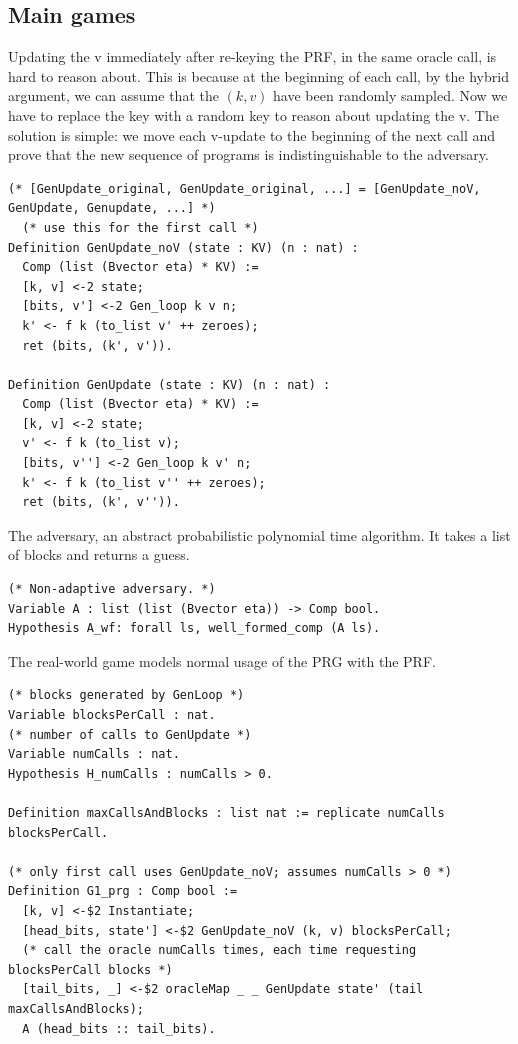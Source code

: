 \documentclass[12pt,lot, lof]{puthesis}
\begin{document}
{\subsection{Main games} \label{sec:main_games}

Updating the v immediately after re-keying the PRF, in the same oracle call, is hard to reason about. This is because at the beginning of each call, by the hybrid argument, we can assume that the $(k,v)$ have been randomly sampled. Now we have to replace the key with a random key to reason about updating the v. The solution is simple: we move each v-update to the beginning of the next call and prove that the new sequence of programs is indistinguishable to the adversary. 

\begin{lstlisting}
(* [GenUpdate_original, GenUpdate_original, ...] = [GenUpdate_noV, GenUpdate, Genupdate, ...] *)
  (* use this for the first call *)
Definition GenUpdate_noV (state : KV) (n : nat) :
  Comp (list (Bvector eta) * KV) :=
  [k, v] <-2 state;
  [bits, v'] <-2 Gen_loop k v n;
  k' <- f k (to_list v' ++ zeroes);
  ret (bits, (k', v')).

Definition GenUpdate (state : KV) (n : nat) :
  Comp (list (Bvector eta) * KV) :=
  [k, v] <-2 state;
  v' <- f k (to_list v);
  [bits, v''] <-2 Gen_loop k v' n;
  k' <- f k (to_list v'' ++ zeroes);
  ret (bits, (k', v'')).
\end{lstlisting}

The adversary, an abstract probabilistic polynomial time algorithm. It takes a list of blocks and returns a guess.

\begin{lstlisting}
(* Non-adaptive adversary. *)
Variable A : list (list (Bvector eta)) -> Comp bool.
Hypothesis A_wf: forall ls, well_formed_comp (A ls).
\end{lstlisting}

The real-world game models normal usage of the PRG with the PRF.

\begin{lstlisting}
(* blocks generated by GenLoop *)
Variable blocksPerCall : nat.      
(* number of calls to GenUpdate *) 
Variable numCalls : nat.        
Hypothesis H_numCalls : numCalls > 0. 

Definition maxCallsAndBlocks : list nat := replicate numCalls blocksPerCall.

(* only first call uses GenUpdate_noV; assumes numCalls > 0 *)
Definition G1_prg : Comp bool :=
  [k, v] <-$2 Instantiate;
  [head_bits, state'] <-$2 GenUpdate_noV (k, v) blocksPerCall;
  (* call the oracle numCalls times, each time requesting blocksPerCall blocks *)
  [tail_bits, _] <-$2 oracleMap _ _ GenUpdate state' (tail maxCallsAndBlocks);
  A (head_bits :: tail_bits).
\end{lstlisting}

}
\end{document}
